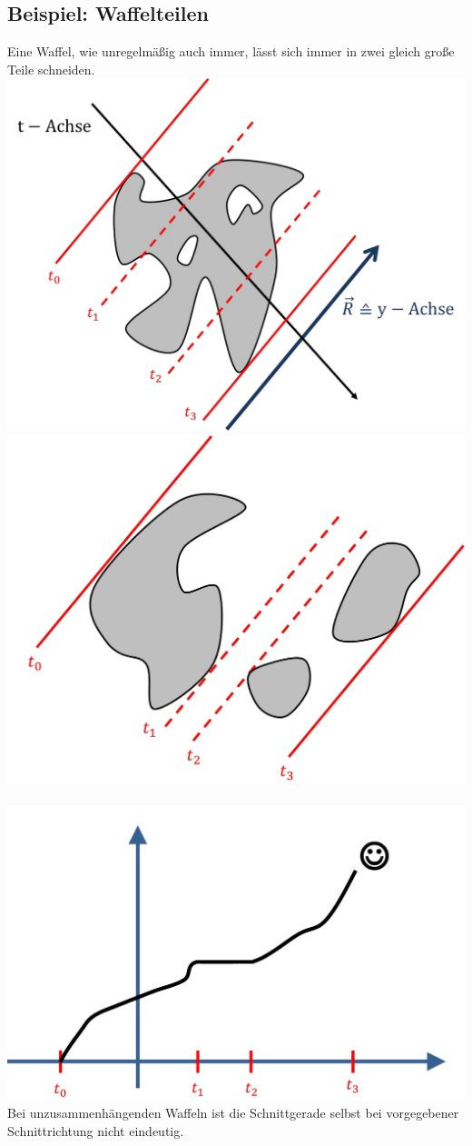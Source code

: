 \documentclass[a4paper,11pt,notitlepage]{report}
\theoremstyle{definition}
\newenvironment{bsp}[1]
{
\setlength{\fboxsep}{10pt}
\subsection*{Beispiel: #1}
\begin{upshape}
}
{
\end{upshape}
}
\begin{document}
\begin{bsp}{Waffelteilen}
	Eine Waffel, wie unregelmäßig auch immer, lässt sich immer in zwei gleich große Teile schneiden.
	\newline
\includegraphics[scale=0.4]{images/Waffel_zshgd.png}
\newline
\includegraphics[scale=0.3]{images/Waffel_unzshgd.png} $\qquad$
\includegraphics[scale=0.3]{images/Waffel_unzshgd_Fkt.png}
\newline
Bei unzusammenhängenden Waffeln ist die Schnittgerade selbst bei vorgegebener Schnittrichtung nicht eindeutig.
\end{bsp}
\end{document}
